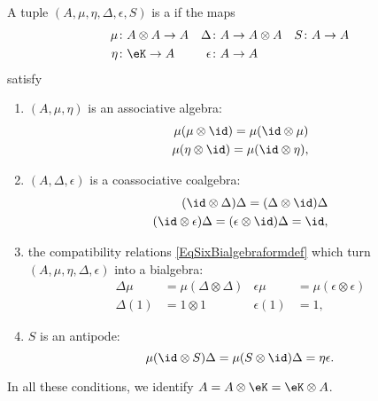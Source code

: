 \begin{definition}      \label{DefHopfAlgebra}
    A tuple \( (A,\mu,\eta,\Delta,\epsilon,S )\) is a  if the maps
    \begin{equation}
        \begin{aligned}[]
            \mu&\colon A\otimes A\to A   &   \Delta&\colon A\to A\otimes A    &   S&\colon A\to A\\
            \eta&\colon \eK\to A         &  \epsilon&\colon A\to A
        \end{aligned}
    \end{equation}
    satisfy
    \begin{enumerate}
        \item
            \( (A,\mu,\eta)\) is an associative algebra:       
            \begin{subequations}
                \begin{align}
                    \mu(\mu\otimes\id)=\mu(\id\otimes\mu)\\
                    \mu(\eta\otimes\id)=\mu(\id\otimes\eta),
                \end{align}
            \end{subequations}
        \item
            \( (A,\Delta,\epsilon)\) is a coassociative coalgebra:
            \begin{subequations}
                \begin{align}
                    (\id\otimes\Delta)\Delta=(\Delta\otimes\id)\Delta\\
                    (\id\otimes\epsilon)\Delta=(\epsilon\otimes\id)\Delta=\id,      \label{EqformCounitDef}
                \end{align}
            \end{subequations}
        \item
            the compatibility relations \eqref{EqSixBialgebraformdef} which turn \( (A,\mu,\eta,\Delta,\epsilon)\) into a bialgebra:
            \begin{subequations}
                \begin{align}
                    \Delta\mu&=\mu(\Delta\otimes\Delta)&\epsilon\mu&=\mu(\epsilon\otimes\epsilon)\\
                    \Delta(1)&=1\otimes 1   &\epsilon(1)&=1,
                \end{align}
            \end{subequations}
        \item
            \( S\) is an antipode:
            \begin{equation}        \label{EqDefPorpAntipode}
                \mu(\id\otimes S)\Delta=\mu(S\otimes\id)\Delta=\eta\epsilon.
            \end{equation}
    \end{enumerate}
    In all these conditions, we identify \( A=A\otimes \eK=\eK\otimes A\).
\end{definition}

